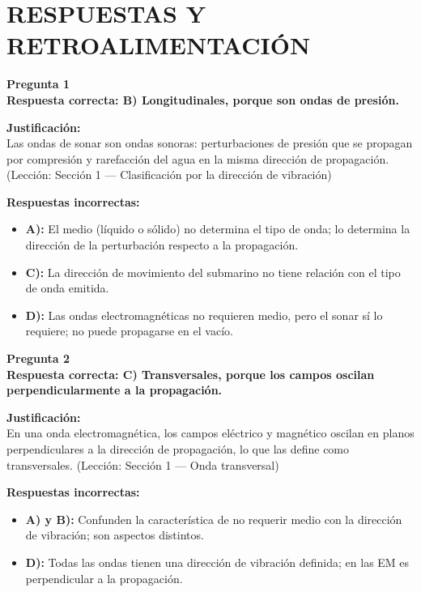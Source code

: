 
\newpage
\onecolumn
\section*{RESPUESTAS Y RETROALIMENTACIÓN}

\begin{respuestabox}
\textbf{Pregunta 1}\\
\textcolor{verdecorrecto}{\textbf{Respuesta correcta: B) Longitudinales, porque son ondas de presión.}}

\textbf{Justificación:}\\
Las ondas de sonar son ondas sonoras: perturbaciones de presión que se propagan por compresión y rarefacción del agua en la misma dirección de propagación. (Lección: Sección 1 — Clasificación por la dirección de vibración)

\textbf{Respuestas incorrectas:}
\begin{itemize}
    \item \textbf{A):} El medio (líquido o sólido) no determina el tipo de onda; lo determina la dirección de la perturbación respecto a la propagación.
    \item \textbf{C):} La dirección de movimiento del submarino no tiene relación con el tipo de onda emitida.
    \item \textbf{D):} Las ondas electromagnéticas no requieren medio, pero el sonar sí lo requiere; no puede propagarse en el vacío.
\end{itemize}
\end{respuestabox}

\begin{respuestabox}
\textbf{Pregunta 2}\\
\textcolor{verdecorrecto}{\textbf{Respuesta correcta: C) Transversales, porque los campos oscilan perpendicularmente a la propagación.}}

\textbf{Justificación:}\\
En una onda electromagnética, los campos eléctrico y magnético oscilan en planos perpendiculares a la dirección de propagación, lo que las define como transversales. (Lección: Sección 1 — Onda transversal)

\textbf{Respuestas incorrectas:}
\begin{itemize}
    \item \textbf{A) y B):} Confunden la característica de no requerir medio con la dirección de vibración; son aspectos distintos.
    \item \textbf{D):} Todas las ondas tienen una dirección de vibración definida; en las EM es perpendicular a la propagación.
\end{itemize}
\end{respuestabox}


